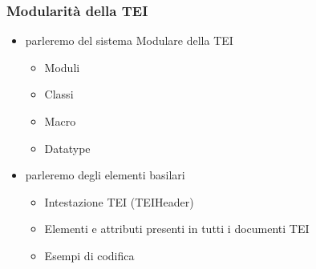 \documentclass{beamer}
\begin{document}
\begin{frame}
	\frametitle{Modularità della TEI}
	\addtocounter{nframe}{1}
    

    \begin{itemize}
        
        \item<1-> parleremo del sistema Modulare della TEI
            \begin{itemize}
                \item<1-> Moduli
                \item<1-> Classi
                \item<1-> Macro
                \item<1-> Datatype     
            \end{itemize} 
        \item<2-> parleremo degli elementi basilari
            \begin{itemize}
                \item<2-> Intestazione TEI (TEIHeader)
                \item<2-> Elementi e attributi presenti in tutti i documenti TEI
                \item<2-> Esempi di codifica
            \end{itemize} 
    \end{itemize}
    
\end{frame}
\end{document}
